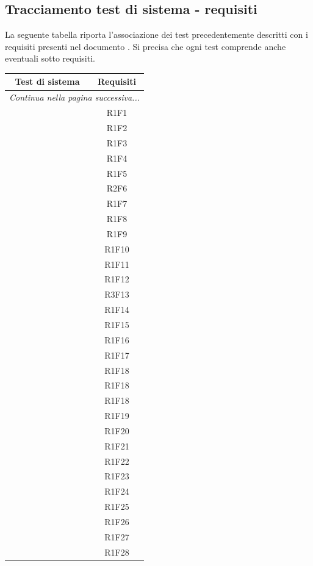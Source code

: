 \subsection{Tracciamento test di sistema - requisiti}
La seguente tabella riporta l'associazione dei test precedentemente descritti con i requisiti presenti nel documento . Si precisa che ogni test comprende anche eventuali sotto requisiti.
\resetCTS
\begin{center}
	\begin{longtable}{|c|c|}
	\hline
	\rowcolor{lighter-grayer}
	\textbf{Test di sistema} & \textbf{Requisiti} \\
	\hline
	\endfirsthead
	\hline
	\multicolumn{2}{|c|}{\textit{Continua nella pagina successiva...}} \\
	\hline
	\endfoot
	\endlastfoot

	\hline
	 & R1F1 \\
	 & R1F2 \\
	 & R1F3 \\
	 & R1F4 \\
	 & R1F5 \\
	 & R2F6 \\
	 & R1F7 \\
	 & R1F8 \\
	 & R1F9 \\
	 & R1F10 \\

	 & R1F11  \\
	 & R1F12 \\
	 & R3F13 \\
	 & R1F14 \\
	 & R1F15 \\
	 & R1F16 \\
	 & R1F17 \\
	 & R1F18 \\
	 & R1F18 \\
	 & R1F18 \\

	 & R1F19 \\
	 & R1F20 \\
	 & R1F21 \\
	 & R1F22 \\
	 & R1F23 \\
	 & R1F24 \\
	 & R1F25 \\
	 & R1F26 \\
	 & R1F27 \\
	 & R1F28 \\
	\hline

	\end{longtable}
\end{center}



